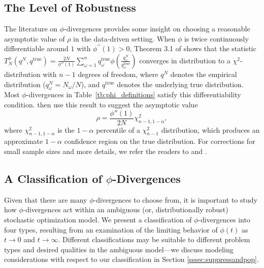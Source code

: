 \documentclass[opre,nonblindrev]{informs3} %
\newcommand{\qtrue}{q^{\text{true}}}
\begin{document}
\subsection{The Level of Robustness}
\label{ssec:robust_level}

The literature on $\phi$-divergences provides some insight on choosing a reasonable asymptotic value of $\rho$ in the data-driven setting. 
When $\phi$ is twice continuously differentiable around $1$ with $\phi^{\prime \prime}(1)>0$, Theorem 3.1 of \cite{pardo2005statistical} shows that the statistic $T^\phi_N(q^N,\qtrue) = \frac{2N}{\phi''(1)} \sum_{\omega=1}^n \qtrue_\omega \phi\left(\frac{q^N_\omega}{\qtrue_\omega}\right)$ converges in distribution to a $\chi^2$-distribution with $n-1$ degrees of freedom, where $q^N$ denotes the empirical distribution ($q^N_\omega = N_\omega/N$), and $\qtrue$ denotes the underlying true distribution.
Most $\phi$-divergences in Table~\ref{tb:phi_definitions} satisfy this differentiability condition.
\cite{bental2011robust} then use this result to suggest the asymptotic value
\begin{equation} \label{eq:asymptotic_rho}
	\rho = \frac{\phi''(1)}{2N} \chi^2_{n-1,1-\alpha},
\end{equation}
where $\chi^2_{n-1,1-\alpha}$ is the $1-\alpha$ percentile of a $\chi^2_{n-1}$ distribution, which produces an approximate $1-\alpha$ confidence region on the true distribution.
For corrections for small sample sizes and more details, we refer the readers to \citep{pardo2005statistical} and \citep{bental2011robust}.

\subsection{A Classification of $\phi$-Divergences}
\label{ssec:classification}

Given that there are many $\phi$-divergences to choose from, it is important to study how $\phi$-divergences act within an ambiguous (or, distributionally robust) stochastic optimization model. 
We present a classification of $\phi$-divergences into four types, resulting from an examination of the limiting behavior of $\phi(t)$ as $t \rightarrow 0$ and $t \rightarrow \infty$.
Different classifications may be suitable to different problem types and desired qualities in the ambiguous model---we discuss modeling considerations with respect to our classification in Section \ref{sssec:suppressandpop}.
\end{document}
